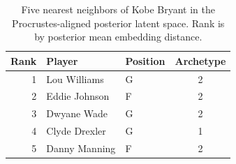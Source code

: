\begin{table}[htbp]
  \centering\small
  \begin{tabular}{rllc}
    \toprule
    Rank & Player & Position & Archetype \\
    \midrule
    1 & Lou Williams & G & 2 \\
    2 & Eddie Johnson & F & 2 \\
    3 & Dwyane Wade & G & 2 \\
    4 & Clyde Drexler & G & 1 \\
    5 & Danny Manning & F & 2 \\
    \bottomrule
  \end{tabular}
  \caption{Five nearest neighbors of Kobe Bryant in the Procrustes-aligned posterior latent space. Rank is by posterior mean embedding distance.}
  \label{tab:Kobe_Bryant_neighbors}
\end{table}

